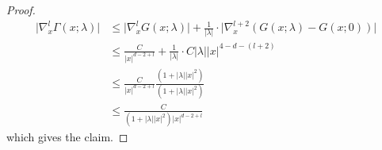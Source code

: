 \begin{proof}
    \begin{align*}
      \big|\nabla_x^l \Gamma(x; \lambda) \big|
      &\leq \big|\nabla_x^l G(x; \lambda) \big| + \frac{1}{|\lambda|} \cdot \big|\nabla_x^{l + 2} ( G(x; \lambda) - G(x; 0))\big| \\
      &\leq \frac{C}{|x|^{d - 2 + l}} + \frac{1}{|\lambda|} \cdot C |\lambda| |x|^{4 - d - (l + 2)} \\
      &\leq \frac{C}{|x|^{d - 2 + l}} \frac{(1 + |\lambda| |x|^2)}{(1 + |\lambda| |x|^2)} \\
      &\leq \frac{C}{(1 + |\lambda| |x|^2) |x|^{d - 2 + l}}
    \end{align*}
    which gives the claim.
  \end{proof}



